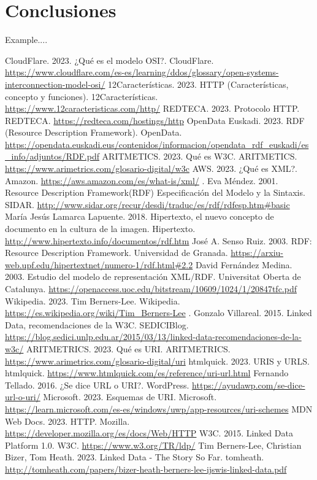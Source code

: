 \documentclass[11pt]{report}
\begin{document}
\chapter{Conclusiones}
Example....

\begin{thebibliography}{99}
	 CloudFlare. 2023.  ¿Qué es el modelo OSI?.  CloudFlare.  \url{https://www.cloudflare.com/es-es/learning/ddos/glossary/open-systems-interconnection-model-osi/}
	 12Características. 2023. HTTP (Características, concepto y funciones). 12Características. \url{https://www.12caracteristicas.com/http/}
	 REDTECA. 2023. Protocolo HTTP. REDTECA. \url{https://redteca.com/hostings/http}
	OpenData Euskadi. 2023. RDF (Resource Description Framework). OpenData. \url{https://opendata.euskadi.eus/contenidos/informacion/opendata_rdf_euskadi/es_info/adjuntos/RDF.pdf}
	 ARITMETICS. 2023. Qué es W3C. ARITMETICS. \url{https://www.arimetrics.com/glosario-digital/w3c}
	 AWS. 2023. ¿Qué es XML?. Amazon. \url{https://aws.amazon.com/es/what-is/xml/}
	.  Eva Méndez. 2001. Resource Description Framework(RDF)	Especificación del Modelo y la Sintaxis. SIDAR. \url{http://www.sidar.org/recur/desdi/traduc/es/rdf/rdfesp.htm#basic}
	 María Jesús Lamarca Lapuente. 2018. Hipertexto, el nuevo concepto de documento en la cultura de la imagen. Hipertexto. \url{http://www.hipertexto.info/documentos/rdf.htm}
	 José A. Senso Ruiz. 2003. RDF: Resource Description Framework. Universidad de Granada. \url{https://arxiu-web.upf.edu/hipertextnet/numero-1/rdf.html#2.2}
	 David Fernández Medina. 2003. Estudio del modelo de representación XML/RDF. Universitat Oberta de Catalunya. \url{https://openaccess.uoc.edu/bitstream/10609/1024/1/20847tfc.pdf}
	 Wikipedia. 2023. Tim Berners-Lee. Wikipedia. \url{https://es.wikipedia.org/wiki/Tim_Berners-Lee}
	. Gonzalo Villareal. 2015. Linked Data, recomendaciones de la W3C. SEDICIBlog. \url{https://blog.sedici.unlp.edu.ar/2015/03/13/linked-data-recomendaciones-de-la-w3c/}
	 ARITMETRICS. 2023. Qué es URI. ARITMETRICS. \url{https://www.arimetrics.com/glosario-digital/uri}
	 htmlquick. 2023. URIS y URLS. htmlquick. \url{https://www.htmlquick.com/es/reference/uri-url.html}
	 Fernando Tellado. 2016. ¿Se dice URL o URI?. WordPress. \url{https://ayudawp.com/se-dice-url-o-uri/}
	 Microsoft. 2023. Esquemas de URI. Microsoft. \url{https://learn.microsoft.com/es-es/windows/uwp/app-resources/uri-schemes}
	 MDN Web Docs. 2023. HTTP. Mozilla. \url{https://developer.mozilla.org/es/docs/Web/HTTP}
	 W3C. 2015. Linked Data Platform 1.0. W3C. \url{https://www.w3.org/TR/ldp/}
	 Tim Berners-Lee, Christian Bizer, Tom Heath. 2023. Linked Data - The Story So Far. tomheath. \url{http://tomheath.com/papers/bizer-heath-berners-lee-ijswis-linked-data.pdf}
\end{thebibliography}
\end{document}
